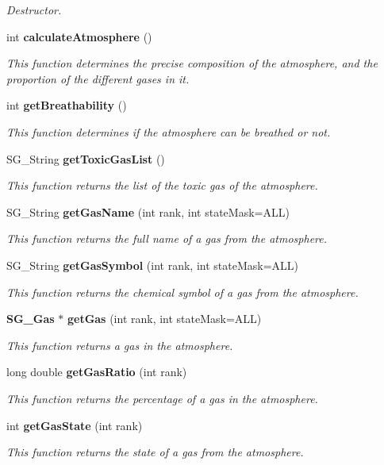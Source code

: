 \begin{CompactItemize}
\begin{CompactList}\small\item\em Destructor. \item\end{CompactList}\item 
int {\bf calculate\-Atmosphere} ()
\begin{CompactList}\small\item\em This function determines the precise composition of the atmosphere, and the proportion of the different gases in it. \item\end{CompactList}\item 
int {\bf get\-Breathability} ()
\begin{CompactList}\small\item\em This function determines if the atmosphere can be breathed or not. \item\end{CompactList}\item 
SG\_\-String {\bf get\-Toxic\-Gas\-List} ()
\begin{CompactList}\small\item\em This function returns the list of the toxic gas of the atmosphere. \item\end{CompactList}\item 
SG\_\-String {\bf get\-Gas\-Name} (int rank, int state\-Mask=ALL)
\begin{CompactList}\small\item\em This function returns the full name of a gas from the atmosphere. \item\end{CompactList}\item 
SG\_\-String {\bf get\-Gas\-Symbol} (int rank, int state\-Mask=ALL)
\begin{CompactList}\small\item\em This function returns the chemical symbol of a gas from the atmosphere. \item\end{CompactList}\item 
{\bf SG\_\-Gas} $\ast$ {\bf get\-Gas} (int rank, int state\-Mask=ALL)
\begin{CompactList}\small\item\em This function returns a gas in the atmosphere. \item\end{CompactList}\item 
long double {\bf get\-Gas\-Ratio} (int rank)
\begin{CompactList}\small\item\em This function returns the percentage of a gas in the atmosphere. \item\end{CompactList}\item 
int {\bf get\-Gas\-State} (int rank)
\begin{CompactList}\small\item\em This function returns the state of a gas from the atmosphere. \item\end{CompactList}\end{CompactItemize}
